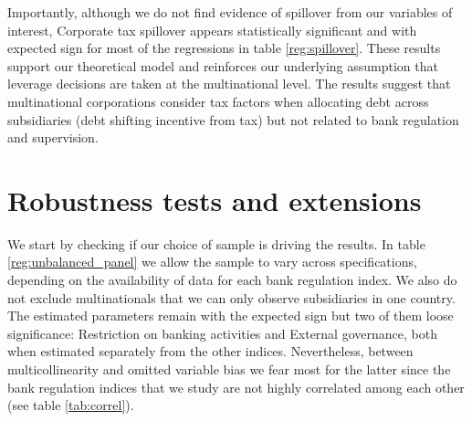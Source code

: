 \documentclass[12pt]{article}
\begin{document}
 Importantly, although we do not find evidence of spillover from our variables of interest, Corporate tax spillover appears statistically significant and with expected sign for most of the regressions in table \ref{reg:spillover}. These results support our theoretical model and reinforces our underlying assumption that leverage decisions are taken at the multinational level. The results suggest that multinational corporations consider tax factors when allocating debt across subsidiaries (debt shifting incentive from tax) but not related to bank regulation and supervision.
			  
	\section{Robustness tests and extensions} \label{sec:robustness}
	We start by checking if our choice of sample is driving the results. In table \ref{reg:unbalanced_panel} we allow the sample to vary across specifications, depending on the availability of data for each bank regulation index. We also do not exclude multinationals that we can only observe subsidiaries in one country. The estimated parameters remain with the expected sign but two of them loose significance: Restriction on banking activities and External governance, both when estimated separately from the other indices. Nevertheless, between multicollinearity and omitted variable bias we fear most for the latter since the bank regulation indices that we study are not highly correlated among each other (see table \ref{tab:correl}).  
	
\end{document}
